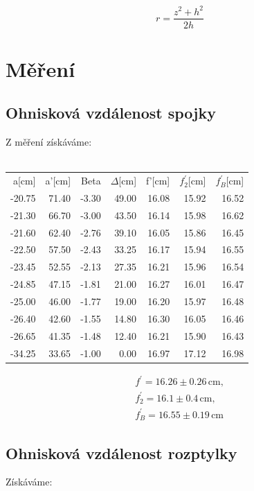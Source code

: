 \documentclass[czech,11pt,a4paper]{article}
\begin{document}
\begin{multicols}{2}
\begin{equation}
	r=\frac{z^{2}+h^{2}}{2 h}
\end{equation}



	
		\section{Měření}
		\subsection{Ohnisková vzdálenost spojky}		
		Z měření získáváme:\\ \\
		{\small \begin{tabular}{rrrr|rrr}
			
			a[cm] & a'[cm] & Beta & $\Delta$[cm] & f'[cm] & $f_2^\prime$[cm] & $f_B^\prime$[cm] \\
			
			-20.75 & 71.40 & -3.30 & 49.00 & 16.08 & 15.92 & 16.52 \\
			-21.30 & 66.70 & -3.00 & 43.50 & 16.14 & 15.98 & 16.62 \\
			-21.60 & 62.40 & -2.76 & 39.10 & 16.05 & 15.86 & 16.45 \\
			-22.50 & 57.50 & -2.43 & 33.25 & 16.17 & 15.94 & 16.55 \\
			-23.45 & 52.55 & -2.13 & 27.35 & 16.21 & 15.96 & 16.54 \\
			-24.85 & 47.15 & -1.81 & 21.00 & 16.27 & 16.01 & 16.47 \\
			-25.00 & 46.00 & -1.77 & 19.00 & 16.20 & 15.97 & 16.48 \\
			-26.40 & 42.60 & -1.55 & 14.80 & 16.30 & 16.05 & 16.46 \\
			-26.65 & 41.35 & -1.48 & 12.40 & 16.21 & 15.90 & 16.43 \\
			-34.25 & 33.65 & -1.00 & 0.00 & 16.97 & 17.12 & 16.98 \\
			
			
		\end{tabular}}
	\begin{align*}
		f^\prime = 16.26 \pm 0.26 \,\mathrm{cm}, \\ f_2^\prime = 16.1\pm 0.4 \,\mathrm{cm}, \\ f_B^\prime = 16.55 \pm 0.19 \,\mathrm{cm}
	\end{align*}
	\subsection{Ohnisková vzdálenost rozptylky}
	Získáváme:\\
	

\end{multicols}
\end{document}
